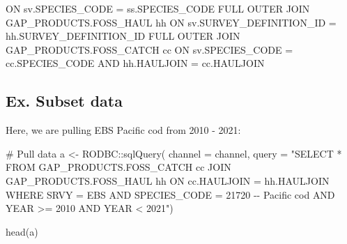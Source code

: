 \documentclass[
  letterpaper,
  oneside,
  open=any]{scrbook}
\newenvironment{Shaded}{\begin{snugshade}}{\end{snugshade}}
\newcommand{\AttributeTok}[1]{\textcolor[rgb]{0.40,0.45,0.13}{#1}}
\newcommand{\CommentTok}[1]{\textcolor[rgb]{0.37,0.37,0.37}{#1}}
\newcommand{\FunctionTok}[1]{\textcolor[rgb]{0.28,0.35,0.67}{#1}}
\newcommand{\KeywordTok}[1]{\textcolor[rgb]{0.00,0.23,0.31}{#1}}
\newcommand{\NormalTok}[1]{\textcolor[rgb]{0.00,0.23,0.31}{#1}}
\newcommand{\OperatorTok}[1]{\textcolor[rgb]{0.37,0.37,0.37}{#1}}
\newcommand{\OtherTok}[1]{\textcolor[rgb]{0.00,0.23,0.31}{#1}}
\newcommand{\SpecialCharTok}[1]{\textcolor[rgb]{0.37,0.37,0.37}{#1}}
\newcommand{\StringTok}[1]{\textcolor[rgb]{0.13,0.47,0.30}{#1}}
\begin{document}
\begin{Shaded}
\begin{Highlighting}[]
\KeywordTok{ON}\NormalTok{ sv.SPECIES\_CODE }\OperatorTok{=}\NormalTok{ ss.SPECIES\_CODE}
\KeywordTok{FULL} \KeywordTok{OUTER} \KeywordTok{JOIN}\NormalTok{ GAP\_PRODUCTS.FOSS\_HAUL hh}
\KeywordTok{ON}\NormalTok{ sv.SURVEY\_DEFINITION\_ID }\OperatorTok{=}\NormalTok{ hh.SURVEY\_DEFINITION\_ID}
\KeywordTok{FULL} \KeywordTok{OUTER} \KeywordTok{JOIN}\NormalTok{ GAP\_PRODUCTS.FOSS\_CATCH cc}
\KeywordTok{ON}\NormalTok{ sv.SPECIES\_CODE }\OperatorTok{=}\NormalTok{ cc.SPECIES\_CODE}
\KeywordTok{AND}\NormalTok{ hh.HAULJOIN }\OperatorTok{=}\NormalTok{ cc.HAULJOIN}
\end{Highlighting}
\end{Shaded}

\hypertarget{ex.-subset-data}{%
\subsection{Ex. Subset data}\label{ex.-subset-data}}

Here, we are pulling EBS Pacific cod from 2010 - 2021:

\begin{Shaded}
\begin{Highlighting}[]
\CommentTok{\# Pull data}
\NormalTok{a }\OtherTok{\textless{}{-}}\NormalTok{ RODBC}\SpecialCharTok{::}\FunctionTok{sqlQuery}\NormalTok{(}
\AttributeTok{channel =}\NormalTok{ channel, }
\AttributeTok{query =} 
\StringTok{"SELECT * FROM GAP\_PRODUCTS.FOSS\_CATCH cc}
\StringTok{JOIN GAP\_PRODUCTS.FOSS\_HAUL hh}
\StringTok{ON cc.HAULJOIN = hh.HAULJOIN}
\StringTok{WHERE SRVY = \textquotesingle{}EBS\textquotesingle{} }
\StringTok{AND SPECIES\_CODE = 21720 {-}{-} \textquotesingle{}Pacific cod\textquotesingle{} }
\StringTok{AND YEAR \textgreater{}= 2010 }
\StringTok{AND YEAR \textless{} 2021"}\NormalTok{)}

\FunctionTok{head}\NormalTok{(a)}
\end{Highlighting}
\end{Shaded}
\end{document}
